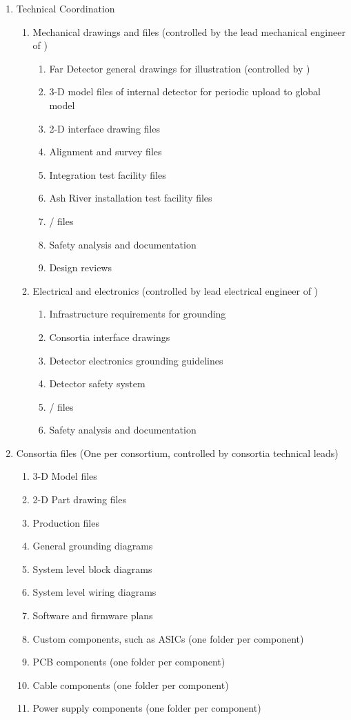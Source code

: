\begin{enumerate}
 \item Technical Coordination
 \begin{enumerate}
  \item Mechanical drawings and files (controlled by the lead mechanical engineer of )
  \begin{enumerate}
    \item Far Detector general drawings for illustration (controlled by )
    \item 3-D model files of internal detector for periodic upload to global model
    \item 2-D interface drawing files    
    \item Alignment and survey files
    \item Integration test facility files
    \item Ash River installation test facility files
    \item {}/ files
    \item Safety analysis and documentation
    \item Design reviews
  \end{enumerate}
  \item Electrical and electronics (controlled by lead electrical engineer of )
  \begin{enumerate}
    \item Infrastructure requirements for grounding
    \item Consortia interface drawings
    \item Detector electronics grounding guidelines
    \item Detector safety system
    \item {}/ files
    \item Safety analysis and documentation
  \end{enumerate}
 \end{enumerate}
 \item Consortia files (One per consortium, controlled by consortia technical leads)
 \begin{enumerate}
   \item 3-D Model files
   \item 2-D Part drawing files
   \item Production files
   \item General grounding diagrams
   \item System level block diagrams
   \item System level wiring diagrams
   \item Software and firmware plans
   \item Custom components, such as ASICs (one folder per component)
   \item PCB components (one folder per component)
   \item Cable components (one folder per component)
   \item Power supply components (one folder per component)
 \end{enumerate}
\end{enumerate}
